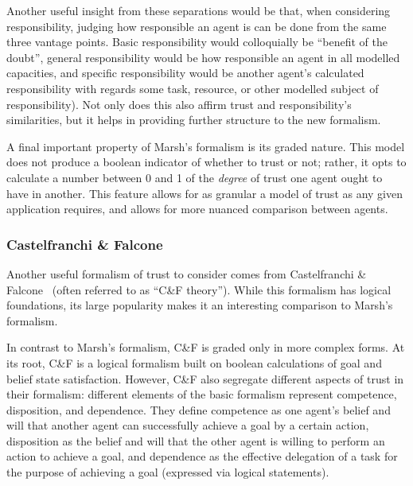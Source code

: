 Another useful insight from these separations would be that, when considering responsibility, judging how responsible an agent is can be done from the same three vantage points. Basic responsibility would colloquially be ``benefit of the doubt'', general responsibility would be how responsible an agent in all modelled capacities, and specific responsibility would be another agent's calculated responsibility with regards some task, resource, or other modelled subject of responsibility). Not only does this also affirm trust and responsibility's similarities, but it helps in providing further structure to the new formalism.\par

A final important property of Marsh's formalism is its graded nature. This model does not produce a boolean indicator of whether to trust or not; rather, it opts to calculate a number between 0 and 1 of the \emph{degree} of trust one agent ought to have in another. This feature allows for as granular a model of trust as any given application requires, and allows for more nuanced comparison between agents.\par


\subsubsection{Castelfranchi \& Falcone}
Another useful formalism of trust to consider comes from Castelfranchi \& Falcone~\cite{CastelfranchiSocialApproach} (often referred to as ``C\&F theory''). While this formalism has logical foundations, its large popularity makes it an interesting comparison to Marsh's formalism.\par

In contrast to Marsh's formalism, C\&F is graded only in more complex forms. At its root, C\&F is a logical formalism built on boolean calculations of goal and belief state satisfaction. However, C\&F also segregate different aspects of trust in their formalism: different elements of the basic formalism represent competence, disposition, and dependence. They define competence as one agent's belief and will that another agent can successfully achieve a goal by a certain action, disposition as the belief and will that the other agent is willing to perform an action to achieve a goal, and dependence as the effective delegation of a task for the purpose of achieving a goal (expressed via logical statements).\par

